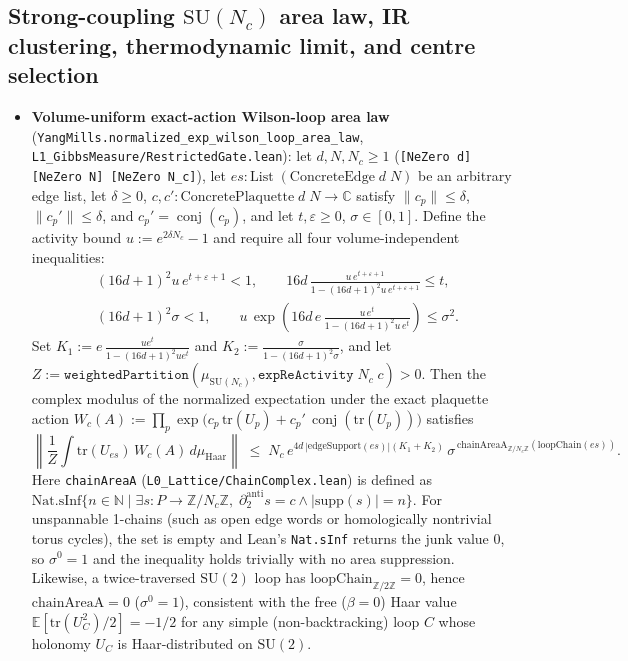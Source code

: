 \documentclass[11pt]{article}
\newcommand{\Z}{\mathbb{Z}}
\newcommand{\C}{\mathbb{C}}
\newcommand{\Ex}{\mathbb{E}}
\newcommand{\conj}[1]{\operatorname{conj}(#1)}
\begin{document}
\subsection{Strong-coupling $\mathrm{SU}(N_c)$ area law, IR clustering, thermodynamic limit, and centre selection}
\begin{itemize}
  \item \textbf{Volume-uniform exact-action Wilson-loop area law}
  (\nolinkurl{YangMills.normalized_exp_wilson_loop_area_law},
  \texttt{L1\_GibbsMeasure/RestrictedGate.lean}): let $d, N, N_c \ge 1$
  (\texttt{[NeZero d] [NeZero N] [NeZero N\_c]}), let
  $es : \mathrm{List}\;(\mathrm{ConcreteEdge}\;d\;N)$ be an arbitrary edge list, let
  $\delta \ge 0$, $c, c' : \mathrm{ConcretePlaquette}\;d\;N \to \C$ satisfy
  $\|c_p\| \le \delta$, $\|c_p'\| \le \delta$, and $c_p' = \conj{c_p}$, and let
  $t, \varepsilon \ge 0$, $\sigma \in [0,1]$. Define the activity bound
  $u := e^{2\delta N_c} - 1$ and require all four volume-independent inequalities:
  \begin{align*}
    &(16d+1)^2 u\, e^{t+\varepsilon+1} < 1, \qquad
    16d\,\frac{u\, e^{t+\varepsilon+1}}{1 - (16d+1)^2 u\, e^{t+\varepsilon+1}} \le t, \\
    &(16d+1)^2 \sigma < 1, \qquad
    u\,\exp\!\left(16d\,e\,\frac{u\, e^t}{1 - (16d+1)^2 u\, e^t}\right) \le \sigma^2 .
  \end{align*}
  Set $K_1 := e\,\frac{u e^t}{1 - (16d+1)^2 u e^t}$ and
  $K_2 := \frac{\sigma}{1 - (16d+1)^2 \sigma}$, and let
  $Z := \texttt{weightedPartition}(\mu_{\mathrm{SU}(N_c)}, \texttt{expReActivity}\;N_c\;c) > 0$.
  Then the complex modulus of the normalized expectation under the exact plaquette action
  $W_c(A) := \prod_p \exp\!\bigl(c_p\,\mathrm{tr}(U_p) + c_p'\,\conj{\mathrm{tr}(U_p)}\bigr)$
  satisfies
  \[
    \left\|\frac{1}{Z}\int \mathrm{tr}(U_{es})\,W_c(A)\,d\mu_{\mathrm{Haar}}\right\|
    \;\le\; N_c\, e^{4d\,|\mathrm{edgeSupport}(es)|(K_1 + K_2)}\,
    \sigma^{\,\mathrm{chainAreaA}_{\Z/N_c\Z}(\mathrm{loopChain}(es))}.
  \]
  Here \texttt{chainAreaA} (\texttt{L0\_Lattice/ChainComplex.lean}) is defined as
  $\mathrm{Nat.sInf}\{n \in \mathbb{N} \mid \exists s : P \to \Z/N_c\Z,\;
  \partial_2^{\mathrm{anti}} s = c \wedge |\mathrm{supp}(s)| = n\}$. For unspannable
  1-chains (such as open edge words or homologically nontrivial torus cycles), the set is
  empty and Lean's \texttt{Nat.sInf} returns the junk value $0$, so $\sigma^0 = 1$ and the
  inequality holds trivially with no area suppression. Likewise, a twice-traversed
  $\mathrm{SU}(2)$ loop has $\mathrm{loopChain}_{\Z/2\Z} = 0$, hence $\mathrm{chainAreaA} = 0$
  ($\sigma^0 = 1$), consistent with the free ($\beta = 0$) Haar value
  $\Ex[\mathrm{tr}(U_C^2)/2] = -1/2$ for any simple (non-backtracking) loop $C$ whose
  holonomy $U_C$ is Haar-distributed on $\mathrm{SU}(2)$.


\end{itemize}
\end{document}
